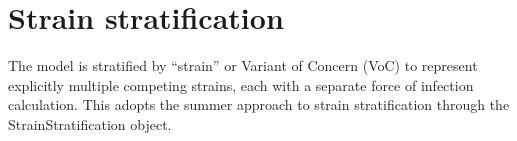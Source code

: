 \section{Strain stratification} \label{strain}
The model is stratified by ``strain'' or Variant of Concern (VoC)
to represent explicitly multiple competing strains, each with a separate force of infection calculation.
This adopts the summer approach to strain stratification through the StrainStratification object.